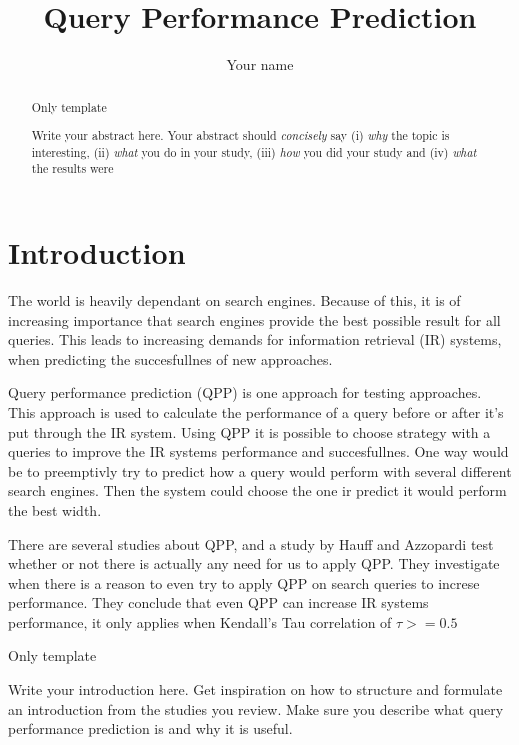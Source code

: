 \documentclass{sig-alternate}
\begin{document}
\title{Query Performance Prediction}
\author{
\alignauthor 
Your name
}
\maketitle

\begin{abstract}
Only template

Write your abstract here. Your abstract should \emph{concisely} say (i) \emph{why} the topic is interesting, (ii) \emph{what} you do in your study, (iii) \emph{how} you did your study and (iv) \emph{what} the results were
\end{abstract}

\section{Introduction}
The world is heavily dependant on search engines. Because of this, it is of increasing importance that search engines provide the best possible result for all queries. This leads to increasing demands for information retrieval (IR) systems, when predicting the succesfullnes of new approaches.

Query performance prediction (QPP) is one approach for testing approaches. This approach is used to calculate the performance of a query before or after it's put through the IR system. Using QPP it is possible to choose strategy with a queries to improve the IR systems performance and succesfullnes. One way would be to preemptivly try to predict how a query would perform with several different search engines. Then the system could choose the one ir predict it would perform the best width.

There are several studies about QPP, and a study by Hauff and Azzopardi\cite{review1} test whether or not there is actually any need for us to apply QPP. They investigate when there is a reason to even try to apply QPP on search queries to increse performance. They conclude that even QPP can increase IR systems performance, it only applies when Kendall's Tau correlation of $\tau >= 0.5$



Only template

Write your introduction here. Get inspiration on how to structure and formulate an introduction from the studies you review. Make sure you describe what query performance prediction is and why it is useful.
\end{document}
